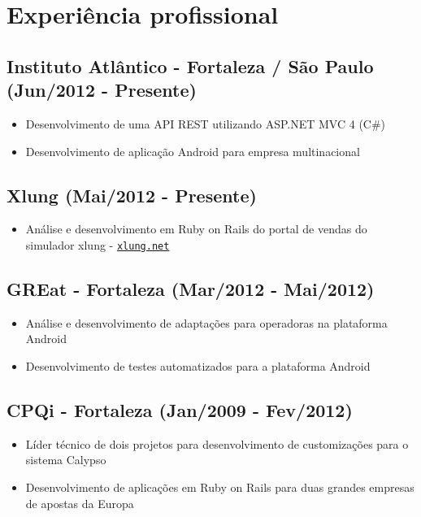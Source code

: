 \documentclass[11pt]{article}
\begin{document}
\section*{Experiência profissional}
{\addtolength{\leftskip}{3.5mm}\subsection*{Instituto Atlântico - Fortaleza / São Paulo (Jun/2012 - Presente)}
\begin{itemize}
\item Desenvolvimento de uma API REST utilizando ASP.NET MVC 4 (C\#)
\item Desenvolvimento de aplicação Android para empresa multinacional
\end{itemize}

\subsection*{Xlung (Mai/2012 - Presente)}
\begin{itemize}
\item Análise e desenvolvimento em Ruby on Rails do portal de vendas do simulador xlung - \href{http://xlung.net}{\tt xlung.net}
\end{itemize}

\subsection*{GREat - Fortaleza (Mar/2012 - Mai/2012)}
\begin{itemize}
\item Análise e desenvolvimento de adaptações para operadoras na plataforma Android
\item Desenvolvimento de testes automatizados para a plataforma Android 
\end{itemize}

\subsection*{CPQi - Fortaleza (Jan/2009 - Fev/2012)}
\begin{itemize}
\item Líder técnico de dois projetos para desenvolvimento de customizações para o sistema Calypso
\item Desenvolvimento de aplicações em Ruby on Rails para duas grandes empresas de apostas da Europa 
\end{itemize}

}
\end{document}
